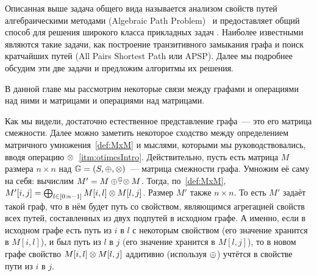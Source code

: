 Описанная выше задача общего вида называется анализом свойств путей алгебраическими методами (Algebraic Path Problem)~ и предоставляет общий способ для решения широкого класса прикладных задач%
.
Наиболее известными являются такие задачи, как построение транзитивного замыкания графа и поиск кратчайших путей (All Pairs Shortest Path или APSP).
Далее мы подробнее обсудим эти две задачи и предложим алгоритмы их решения.


 В данной главе мы рассмотрим некоторые связи%
 между графами и операциями над ними и матрицами и операциями над матрицами.

 Как мы видели, достаточно естественное представление графа~--- это его матрица смежности.
 Далее можно заметить некоторое сходство между определением матричного умножения~\ref{def:MxM} и мыслями, которыми мы руководствовались, вводя операцию $\otimes$~\ref{itm:otimesIntro}.
 Действительно, пусть есть матрица $M$ размера $n \times n$ над $\mathbb{G} = (S, \oplus, \otimes)$~--- матрица смежности графа.
 Умножим её саму на себя: вычислим $M'= M \oplus \! \overset{\mathbb{G}}{.} \! \otimes M$.
 Тогда, по~\ref{def:MxM}, $M'[i, j] = \bigoplus_{l \in [0 \rng n-1]} M[i, l] \opMult M[l, j]$.
 Размер $M'$ также $n \times n$.
 То есть $M'$ задаёт такой граф, что в нём будет путь со свойством, являющимся агрегацией свойств всех путей, составленных из двух подпутей в исходном графе.
 А именно, если в исходном графе есть путь из $i$ в $l$ с некоторым свойством (его значение хранится в $M[i, l]$), и был путь из $l$ в $j$ (его значение хранится в $M[l,j]$), то в новом графе свойство $M[i, l] \otimes M[l, j]$ аддитивно (используя $\oplus$) учтётся в свойстве пути из $i$ в $j$.

